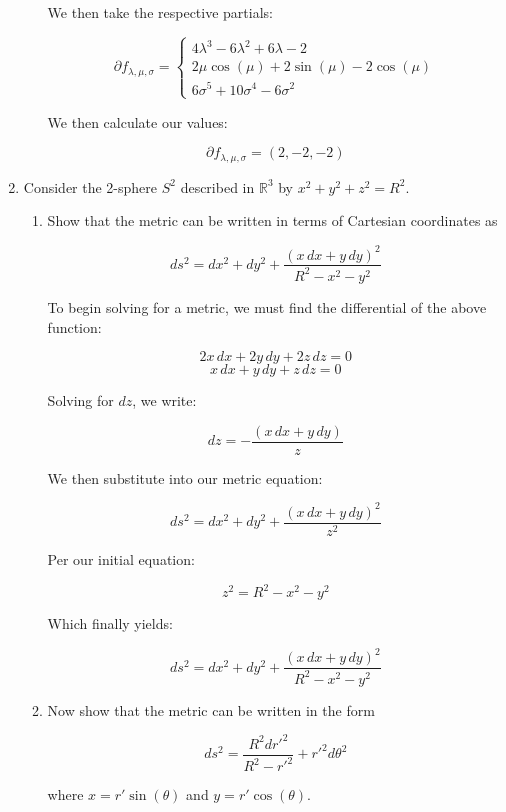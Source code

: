 \begin{enumerate}
\begin{enumerate}
          We then take the respective partials:

          $$\partial f_{\lambda,\mu,\sigma}=\left\{\begin{array}{l} 4\lambda^3-6\lambda^2+6\lambda-2\\ 2\mu\cos(\mu)+2\sin(\mu)-2\cos(\mu)\\6\sigma^5+10\sigma^4-6\sigma^2\end{array}$$

          We then calculate our values:

          $$\boxed{\partial f_{\lambda,\mu,\sigma}=(2,-2,-2)}$$

    \end{enumerate}

  \item Consider the 2-sphere $S^2$ described in $\mathbb{R}^3$ by $x^2+y^2+z^2=R^2$.

    \begin{enumerate}

      \item Show that the metric can be written in terms of Cartesian coordinates as 

        $$ds^2 = dx^2 + dy^2 + \dfrac{(x\,dx + y\,dy)^2}{R^2-x^2-y^2}$$

        To begin solving for a metric, we must find the differential of the above function:

        $$2x\,dx+2y\,dy+2z\,dz=0$$
        $$x\,dx+y\,dy+z\,dz=0$$

        Solving for $dz$, we write:

        $$dz=-\frac{(x\,dx+y\,dy)}{z}$$

        We then substitute into our metric equation:

        $$ds^2=dx^2+dy^2+\frac{(x\,dx+y\,dy)^2}{z^2}$$

        Per our initial equation:

        $$z^2=R^2-x^2-y^2$$

        Which finally yields:

        $$\boxed{ds^2=dx^2+dy^2+\frac{(x\,dx+y\,dy)^2}{R^2-x^2-y^2}}$$

      \item Now show that the metric can be written in the form 
        
        $$ds^2=\dfrac{R^2dr\prime^2}{R^2-r\prime^2}+ r\prime^2d\theta^2$$

        where $x=r\prime\sin(\theta)$ and $y=r\prime\cos(\theta)$.\\


\end{enumerate}
\end{enumerate}
